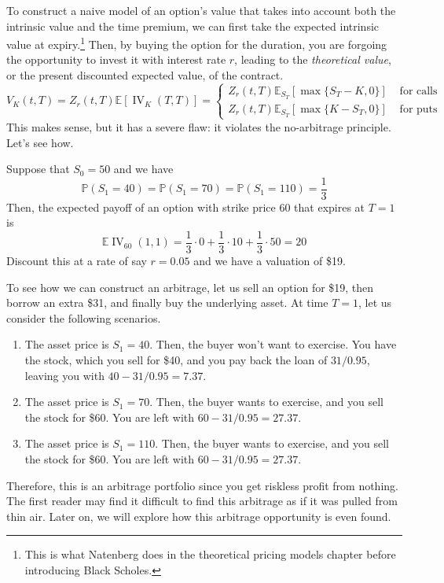 \documentclass{article}
\DeclareMathOperator{\IV}{IV}
\begin{document}
    To construct a naive model of an option's value that takes into account both the intrinsic value and the time premium, we can first take the expected intrinsic value at expiry.\footnote{This is what Natenberg does in the theoretical pricing models chapter before introducing Black Scholes.} Then, by buying the option for the duration, you are forgoing the opportunity to invest it with interest rate $r$, leading to the \textit{theoretical value}, or the present discounted expected value, of the contract. 
    \begin{equation}
      V_K (t, T) = Z_r (t, T) \mathbb{E} [\IV_K(T, T)]  = \begin{cases} 
        Z_r (t, T) \mathbb{E}_{S_T} [ \max\{S_T - K, 0 \}] & \text{ for calls} \\ 
        Z_r (t, T) \mathbb{E}_{S_T} [ \max\{K - S_T, 0 \}] & \text{ for puts}
      \end{cases}
    \end{equation}
    This makes sense, but it has a severe flaw: it violates the no-arbitrage principle. Let's see how. 

    \begin{example}
      Suppose that $S_0 = 50$ and we have 
      \begin{equation}
        \mathbb{P}(S_1 = 40) = \mathbb{P}(S_1 = 70) = \mathbb{P}(S_1 = 110) = \frac{1}{3}
      \end{equation}
      Then, the expected payoff of an option with strike price $60$ that expires at $T = 1$ is 
      \begin{equation}
        \mathbb{E}{\IV_{60} (1, 1)} = \frac{1}{3} \cdot 0 + \frac{1}{3} \cdot 10 + \frac{1}{3} \cdot 50 = 20
      \end{equation}
      Discount this at a rate of say $r = 0.05$ and we have a valuation of \$19. 

      To see how we can construct an arbitrage, let us sell an option for \$19, then borrow an extra \$31, and finally buy the underlying asset. At time $T = 1$, let us consider the following scenarios. 
      \begin{enumerate}
        \item The asset price is $S_1 = 40$. Then, the buyer won't want to exercise. You have the stock, which you sell for \$40, and you pay back the loan of $31 /0.95$, leaving you with $40 - 31 / 0.95 = 7.37$.
        \item The asset price is $S_1 = 70$. Then, the buyer wants to exercise, and you sell the stock for \$60. You are left with $60 - 31 / 0.95 = 27.37$. 
        \item The asset price is $S_1 = 110$. Then, the buyer wants to exercise, and you sell the stock for \$60. You are left with $60 - 31 / 0.95 = 27.37$. 
      \end{enumerate}
      Therefore, this is an arbitrage portfolio since you get riskless profit from nothing. The first reader may find it difficult to find this arbitrage as if it was pulled from thin air. Later on, we will explore how this arbitrage opportunity is even found. 
    \end{example}
  
\end{document}
